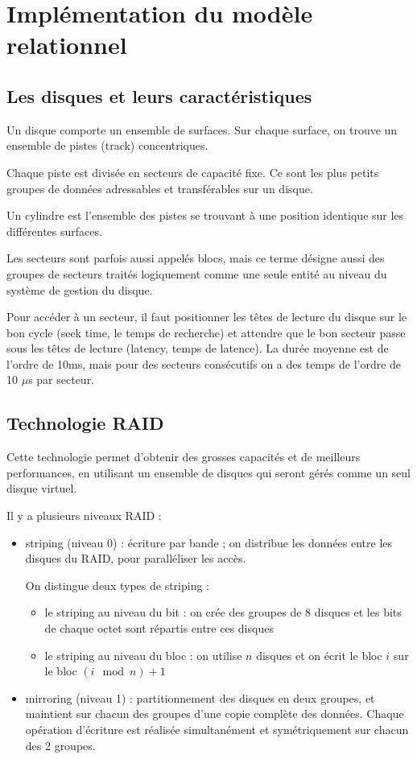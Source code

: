 \chapter{Implémentation du modèle relationnel}

	\section{Les disques et leurs caractéristiques}
	
	Un disque comporte un ensemble de surfaces. Sur chaque surface, on trouve un ensemble de pistes (track) concentriques.
	
	Chaque piste est divisée en secteurs de capacité fixe. Ce sont les plus petits groupes de données adressables et transférables sur un disque.
	
	Un cylindre est l'ensemble des pistes se trouvant à une position identique sur les différentes surfaces.
	
	Les secteurs sont parfois aussi appelés blocs, mais ce terme désigne aussi des groupes de secteurs traités logiquement comme une seule entité au niveau du système de gestion du disque.
	
	Pour accéder à un secteur, il faut positionner les têtes de lecture du disque sur le bon cycle (seek time, le temps de recherche) et attendre que le bon secteur passe sous les têtes de lecture (latency, temps de latence). La durée moyenne est de l'ordre de 10ms, mais pour des secteurs consécutifs on a des temps de l'ordre de 10 $\mu$s par secteur.
	
	
	\section{Technologie RAID}
	
	Cette technologie permet d'obtenir des grosses capacités et de meilleurs performances, en utilisant un ensemble de disques qui seront gérés comme un seul disque virtuel.
	
	Il y a plusieurs niveaux RAID :
	
	\begin{itemize}
		\item striping (niveau 0) : écriture par bande ; on distribue les données entre les disques du RAID, pour paralléliser les accès.
		
		On distingue deux types de striping :
		
		\begin{itemize}
			\item le striping au niveau du bit : on crée des groupes de 8 disques et les bits de chaque octet sont répartis entre ces disques
			\item le striping au niveau du bloc : on utilise $n$ disques et on écrit le bloc $i$ sur le bloc $(i \mod n) + 1$
		\end{itemize}		
		
		\item mirroring (niveau 1) : partitionnement des disques en deux groupes, et maintient sur chacun des groupes d'une copie complète des données. Chaque opération d'écriture est réalisée simultanément et symétriquement sur chacun des 2 groupes.
	\end{itemize}
	
